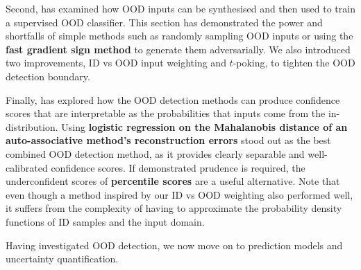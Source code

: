 Second,  has examined how OOD inputs can be synthesised and then used to train a supervised OOD classifier. This section has demonstrated the power and shortfalls of simple methods such as randomly sampling OOD inputs or using the \textbf{fast gradient sign method} to generate them adversarially. We also introduced two improvements, ID vs OOD input weighting and $t$-poking, to tighten the OOD detection boundary.

Finally,  has explored how the OOD detection methods can produce confidence scores that are interpretable as the probabilities that inputs come from the in-distribution. Using \textbf{logistic regression on the Mahalanobis distance of an auto-associative method's reconstruction errors} stood out as the best combined OOD detection method, as it provides clearly separable and well-calibrated confidence scores. If demonstrated prudence is required, the underconfident scores of \textbf{percentile scores} are a useful alternative. Note that even though a method inspired by our ID vs OOD weighting also performed well, it suffers from the complexity of having to approximate the probability density functions of ID samples and the input domain.

\newpar Having investigated OOD detection, we now move on to prediction models and uncertainty quantification.
